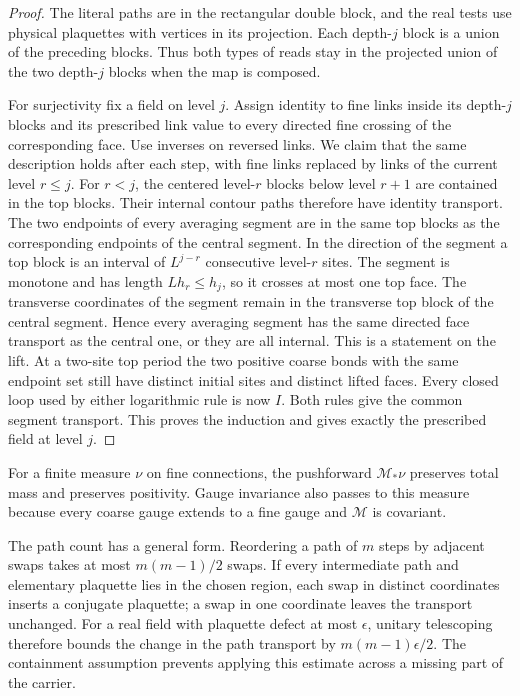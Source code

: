 \documentclass[11pt,letterpaper,reqno]{amsart}
\numberwithin{equation}{section}
\theoremstyle{definition}
\theoremstyle{remark}
\begin{document}
\begin{proof}
The literal paths are in the rectangular double block, and the
real tests use physical plaquettes with vertices in its projection.
Each depth-\(j\) block is a union of the preceding blocks. Thus
both types of reads stay in the projected union of the two
depth-\(j\) blocks when the map is composed.

For surjectivity fix a field on level \(j\). Assign identity to
fine links inside its depth-\(j\) blocks and its prescribed link
value to every directed fine crossing of the corresponding face.
Use inverses on reversed links. We claim that the same description
holds after each step, with fine links replaced by links of the
current level \(r\le j\). For \(r<j\), the centered level-\(r\)
blocks below level \(r+1\) are contained in the top blocks.
Their internal contour paths therefore have identity transport.
The two endpoints of every averaging segment are in the same
top blocks as the corresponding endpoints of the central
segment. In the direction of the segment a top block is an
interval of \(L^{j-r}\) consecutive level-\(r\) sites. The
segment is monotone and has length \(Lh_r\le h_j\), so it crosses
at most one top face. The transverse coordinates of the segment
remain in the transverse top block of the central segment.
Hence every averaging segment has the same directed face
transport as the central one, or they are all internal. This
is a statement on the lift. At a two-site top period the two
positive coarse bonds with the same endpoint set still have
distinct initial sites and distinct lifted faces. Every closed
loop used by either logarithmic rule is now \(I\). Both rules
give the common segment transport. This proves the induction
and gives exactly the prescribed field at level \(j\).
\end{proof}

For a finite measure \(\nu\) on fine connections, the pushforward
\(\mathcal M_*\nu\) preserves total mass and preserves positivity.
Gauge invariance also passes to this measure because every coarse
gauge extends to a fine gauge and \(\mathcal M\) is covariant.

The path count has a general form. Reordering a path of $m$ steps
by adjacent swaps takes at most $m(m-1)/2$ swaps. If every
intermediate path and elementary plaquette lies in the chosen
region, each swap in distinct coordinates inserts a conjugate
plaquette; a swap in one coordinate leaves the transport unchanged.
For a real field
with plaquette defect at most $\epsilon$, unitary telescoping
therefore bounds the change in the path transport by
$m(m-1)\epsilon/2$. The containment assumption prevents applying
this estimate across a missing part of the carrier.
\end{document}
